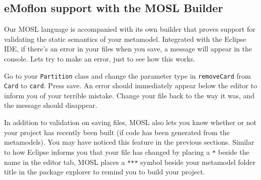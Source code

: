 \newpage
\texHeader

\subsection{ eMoflon support with the MOSL Builder }

\hypertarget{validation tex}{} Our MOSL language is accompanied with its own builder that proves support for validating the static semantics of your metamodel.
Integrated with the Eclipse IDE, if there's an error in your files when you save, a message will appear in the console. Lets try to make an error, just to
see how this works.

Go to your \texttt{Partition} class and change the parameter type in \texttt{removeCard} from \texttt{Card} to \texttt{card}. Press save. An error should
immediately appear below the editor to inform you of your terrible mistake. Change your file back to the way it was, and the message should disappear.

In addition to validation on saving files, MOSL also lets you know whether or not your project has
recently been built (if code has been generated from the metamodels). You may have noticed this feature in the previous sections. Similar to how Eclipse
informs you that your file has changed by placing a \texttt{*} beside the name in the editor tab, MOSL places a \texttt{***} symbol beside your metamodel folder
title in the package explorer to remind you to build your project.

